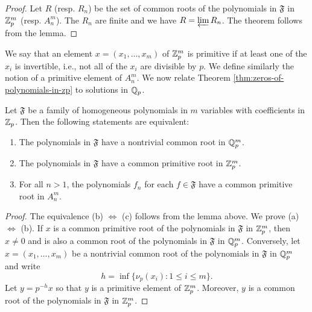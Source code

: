 \begin{proof}
    Let \(R\) (resp. \(R_n\)) be the set of common roots of the polynomials in
    \(\mathfrak{F}\) in \(\mathbb{Z}_p^m\) (resp. \(A_n^m\)). The \(R_n\) are
    finite and we have \(R = \varprojlim R_n\). The theorem follows from the
    lemma.
\end{proof}

We say that an element \(x = (x_1, \dots, x_m)\) of \(\mathbb{Z}_p^m\) is
primitive if at least one of the \(x_i\) is invertible, i.e., not all of the
\(x_i\) are divisible by \(p\). We define similarly the notion of a primitive
element of \(A_n^m\). We now relate Theorem \ref{thm:zeros-of-polynomials-in-zp}
to solutions in \(\mathbb{Q}_p\).

\begin{theoremx}\label{thm:zeros-of-polynomials-in-qp-family} Let
    \(\mathfrak{F}\) be a family of homogeneous polynomials in \(m\) variables
    with coefficients in \(\mathbb{Z}_p\). Then the following statements are
    equivalent:

    \smallskip

    \begin{enumerate}[nosep, label=(\alph*)]
        \item The polynomials in \(\mathfrak{F}\) have a nontrivial common root
        in \(\mathbb{Q}_p^m\).
        \item The polynomials in \(\mathfrak{F}\) have a common primitive root
        in \(\mathbb{Z}_p^m\).
        \item For all \(n > 1\), the polynomials \(f_n\) for each \(f \in
        \mathfrak{F}\) have a common primitive root in \(A_n^m\).
    \end{enumerate}
\end{theoremx}

\begin{proof}
    The equivalence (b) \(\iff\) (c) follows from the lemma above. We prove (a)
    \(\iff\) (b). If \(x\) is a common primitive root of the polynomials in
    \(\mathfrak{F}\) in \(\mathbb{Z}_p^m\), then \(x \neq 0\) and is also a
    common root of the polynomials in \(\mathfrak{F}\) in \(\mathbb{Q}_p^m\).
    Conversely, let \(x = (x_1, \dots, x_m)\) be a nontrivial common root of the
    polynomials in \(\mathfrak{F}\) in \(\mathbb{Q}_p^m\) and write
    \[
      h = \inf\{\nu_p(x_i) : 1 \leq i \leq m\}.
    \]
    Let \(y = p^{-h}x\) so that \(y\) is a primitive element of
    \(\mathbb{Z}_p^m\). Moreover, \(y\) is a common root of the polynomials in
    \(\mathfrak{F}\) in \(\mathbb{Z}_p^m\).
\end{proof}

